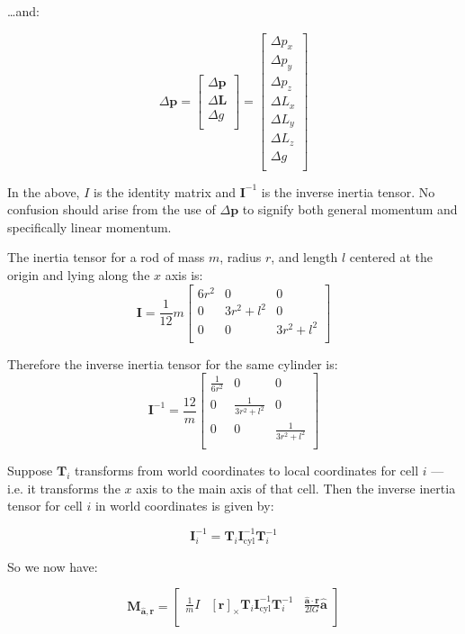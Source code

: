 \documentclass{report}
\renewcommand{\vec}[1]{\mathbf{#1}}
\let\oldhat\hat
\renewcommand{\hat}[1]{\oldhat{\mathbf{#1}}}
\newcommand{\deltap}{\Delta \vec{p}}
\newcommand{\deltaL}{\Delta \vec{L}}
\newcommand{\deltag}{\Delta g}
\newcommand{\IInv}{\mathbf{I}^{-1}}
\newcommand{\rx}{{\left[\vec{r}\right]}_\times}
\begin{document}
\dots and:

\[
\deltap
=
\left[
\begin{array}{c}
\deltap \\
\deltaL \\
\deltag \\
\end{array}
\right]
=
\left[
\begin{array}{c}
\Delta p_x \\
\Delta p_y \\
\Delta p_z \\
\Delta L_x \\
\Delta L_y \\
\Delta L_z \\
\deltag \\
\end{array}
\right]
\]

In the above, $I$ is the identity matrix and $\IInv$ is the inverse
inertia tensor.  No confusion should arise from the use of $\deltap$
to signify both general momentum and specifically linear momentum.

The inertia tensor for a rod of mass $m$, radius $r$, and length $l$
centered at the origin and lying along the $x$ axis is:
\[
\mathbf{I}
=
\frac{1}{12}m
\left[
\begin{array}{ccc}
6r^2 & 0 & 0 \\
0 & 3r^2 + l^2 & 0 \\
0 & 0 & 3r^2 + l^2 \\
\end{array}
\right]
\]

Therefore the inverse inertia tensor for the same cylinder is:
\[
\IInv
=
\frac{12}{m}
\left[
\begin{array}{ccc}
\frac{1}{6r^2} & 0 & 0 \\
0 & \frac{1}{3r^2+l^2} & 0 \\
0 & 0 & \frac{1}{3r^2+l^2} \\
\end{array}
\right]
\]

Suppose $\mathbf{T}_i$ transforms from world coordinates to local
coordinates for cell $i$ --- i.e. it transforms the $x$ axis to the
main axis of that cell.  Then the inverse inertia tensor for cell $i$
in world coordinates is given by:

\[\IInv_i = \mathbf{T}_i \IInv_\textrm{cyl} \mathbf{T}_i^{-1}\]

So we now have:

\[
\vec{M}_{\hat{a},{\vec{r}}}
=
\left[
\begin{array}{ccc}
\frac{1}{m}I &
\rx \mathbf{T}_i \IInv_\textrm{cyl} \mathbf{T}_i^{-1} &
\frac{\hat{a}\cdot\vec{r}}{2lG}\hat{a}\\
\end{array}
\right]
\]
\end{document}
